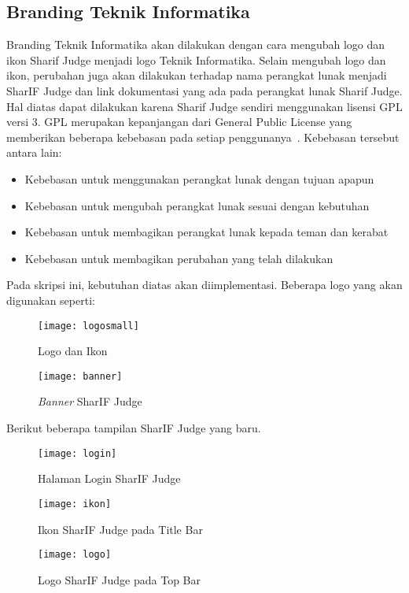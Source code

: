 \subsection{Branding Teknik Informatika}
Branding Teknik Informatika akan dilakukan dengan cara mengubah logo dan ikon Sharif Judge menjadi logo Teknik Informatika. Selain mengubah logo dan ikon, perubahan juga akan dilakukan terhadap nama perangkat lunak menjadi SharIF Judge dan link dokumentasi yang ada pada perangkat lunak Sharif Judge. Hal diatas dapat dilakukan karena Sharif Judge sendiri menggunakan lisensi GPL versi 3. GPL merupakan kepanjangan dari General Public License yang memberikan beberapa kebebasan pada setiap penggunanya~\cite{brett:10:moss}.
Kebebasan tersebut antara lain:
	\begin{itemize}
		\item Kebebasan untuk menggunakan perangkat lunak dengan tujuan apapun \\
		\item Kebebasan untuk mengubah perangkat lunak sesuai dengan kebutuhan \\
		\item Kebebasan untuk membagikan perangkat lunak kepada teman dan kerabat \\
		\item Kebebasan untuk membagikan perubahan yang telah dilakukan
	\end{itemize}
Pada skripsi ini, kebutuhan diatas akan diimplementasi. Beberapa logo yang akan digunakan seperti:

\begin{figure}[H]
	\centering  
	\texttt{[image: logosmall]}  
	\caption[Logo dan Ikon]{Logo dan Ikon} 
	\label{fig:logosmall} 
\end{figure} 

\begin{figure}[H]
	\centering  
	\texttt{[image: banner]}  
	\caption[\textit{Banner} SharIF Judge]{\textit{Banner} SharIF Judge} 
	\label{fig:banner} 
\end{figure} 

\pagebreak

Berikut beberapa tampilan SharIF Judge yang baru.
\begin{figure}[H]
	\centering  
	\texttt{[image: login]}  
	\caption[Halaman Login SharIF Judge]{Halaman Login SharIF Judge} 
	\label{fig:login} 
\end{figure}

\begin{figure}[H]
	\centering  
	\texttt{[image: ikon]}  
	\caption[Ikon SharIF Judge pada Title Bar]{Ikon SharIF Judge pada Title Bar} 
	\label{fig:ikon} 
\end{figure} 

\begin{figure}[H]
	\centering  
	\texttt{[image: logo]}  
	\caption[Logo SharIF Judge pada Top Bar]{Logo SharIF Judge pada Top Bar} 
	\label{fig:logo} 
\end{figure} 
